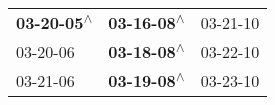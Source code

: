 \begin{supertabular}{lll}
 \textbf{03-20-05\textsuperscript{$\wedge$}} &  \textbf{03-16-08\textsuperscript{$\wedge$}} &  03-21-10\textsuperscript{} \\
                  03-20-06\textsuperscript{} &  \textbf{03-18-08\textsuperscript{$\wedge$}} &  03-22-10\textsuperscript{} \\
                  03-21-06\textsuperscript{} &  \textbf{03-19-08\textsuperscript{$\wedge$}} &  03-23-10\textsuperscript{} \\
\end{supertabular}
